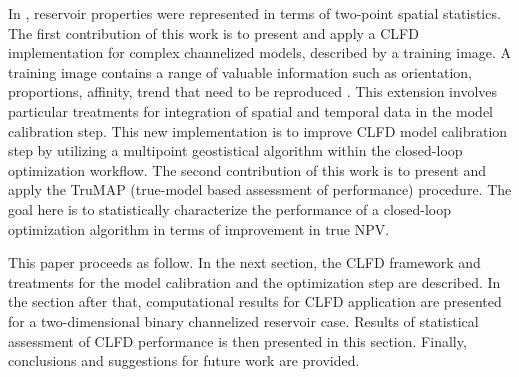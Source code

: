 \documentclass[11pt]{article}
\begin{document}

In \citet{shirangi:15b}, reservoir properties were represented in terms of two-point spatial statistics.
The first contribution of this work is to present and apply a CLFD implementation for complex channelized models, described by a training image.
A training image contains a range of valuable information such as orientation, proportions, affinity, trend that need to be reproduced \citep{tahmasebi:14,mariethoz:14}.
This extension involves particular treatments for integration of spatial and temporal data in the model calibration step.
This new implementation is to improve CLFD model calibration step by utilizing a multipoint geostistical algorithm within the closed-loop optimization workflow.
The second contribution of this work is to present and apply the TruMAP (true-model based assessment of performance)
procedure.
The goal here is to statistically characterize the performance of a closed-loop optimization algorithm in terms of improvement in true NPV.



This paper proceeds as follow.
In the next section, the CLFD framework and treatments for the model calibration and the optimization step are described.
In the section after that, computational results for CLFD application are presented for a two-dimensional binary channelized reservoir case.
Results of statistical assessment of CLFD performance is then presented in this section.
Finally, conclusions and suggestions for future work are provided.
\end{document}
